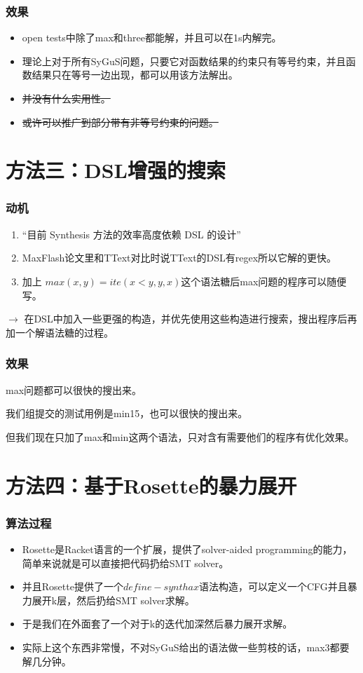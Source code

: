 \documentclass[notheorems]{beamer} %
\begin{document}
  \begin{frame}
    \frametitle{效果}
    \begin{itemize}
      \item open tests中除了max和three都能解，并且可以在1s内解完。
      \item 理论上对于所有SyGuS问题，只要它对函数结果的约束只有等号约束，并且函数结果只在等号一边出现，都可以用该方法解出。
      \item \sout{并没有什么实用性。}
      \item \sout{或许可以推广到部分带有非等号约束的问题。}
    \end{itemize}
  \end{frame}

  \section{方法三：DSL增强的搜索}
  \begin{frame}
    \frametitle{动机}
    \begin{enumerate}
      \item “目前 Synthesis 方法的效率高度依赖 DSL 的设计”
      \item MaxFlash论文里和TText对比时说TText的DSL有regex所以它解的更快。
      \item 加上 $max(x,y) = ite(x<y, y, x)$这个语法糖后max问题的程序可以随便写。
    \end{enumerate}
    $\to$ 在DSL中加入一些更强的构造，并优先使用这些构造进行搜索，搜出程序后再加一个解语法糖的过程。
  \end{frame}
  \begin{frame}
    \frametitle{效果}
    max问题都可以很快的搜出来。

    我们组提交的测试用例是min15，也可以很快的搜出来。

    但我们现在只加了max和min这两个语法，只对含有需要他们的程序有优化效果。
  \end{frame}

  \section{方法四：基于Rosette的暴力展开}
  \begin{frame}
    \frametitle{算法过程}
    \begin{itemize}
      \item Rosette是Racket语言的一个扩展，提供了solver-aided programming的能力，简单来说就是可以直接把代码扔给SMT solver。
      \item 并且Rosette提供了一个$define-synthax$语法构造，可以定义一个CFG并且暴力展开k层，然后扔给SMT solver求解。
      \item 于是我们在外面套了一个对于k的迭代加深然后暴力展开求解。
      \item 实际上这个东西非常慢，不对SyGuS给出的语法做一些剪枝的话，max3都要解几分钟。
    \end{itemize}
  \end{frame}
\end{document}
